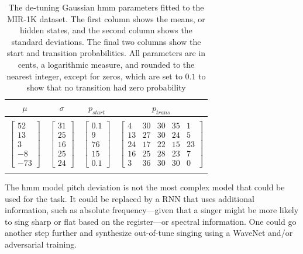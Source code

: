 \begin{table}[t]
  \begin{center}
    \begin{tabular}{|c|c|c|c|}
    \hline
      $\mu$ & $\sigma$ & $p_{start}$ & $p_{trans}$ \\
      \hline
      &&& \\
      $\left[ \begin{array}{c} 52 \\  13 \\3\\-8\\-73 \end{array}\right]$
      & $\left[ \begin{array}{c} 31  \\ 25\\16\\25\\24 \end{array}\right]$
      & $\left[ \begin{array}{c} 0.1  \\ 9\\76\\15\\0.1 \end{array}\right]$
      & $\left[ \begin{array}{ccccc} 4 & 30 & 30 & 35 & 1  \\ 13&27&30&24&5\\24&17&22&15&23\\16&25&28&23&7\\3&36&30&30&0 \end{array}\right]$  \\
      &&& \\
      \hline
    \end{tabular}
    \label{tab:detuning-hmm}
    \caption{The de-tuning Gaussian \gls{hmm} parameters fitted to the MIR-1K dataset. The first column shows the means, or hidden states, and the second column shows the standard deviations. The final two columns show the start and transition probabilities. All parameters are in cents, a logarithmic measure, and rounded to the nearest integer, except for zeros, which are set to $0.1$ to show that no transition had zero probability}
  \end{center}
\end{table}

The \gls{hmm} model pitch deviation is not the most complex model that could be used for the task. It could be replaced by a RNN that uses additional information, such as absolute frequency---given that a singer might be more likely to sing sharp or flat based on the register---or spectral information. One could go another step further and synthesize out-of-tune singing using a WaveNet and/or adversarial training.

